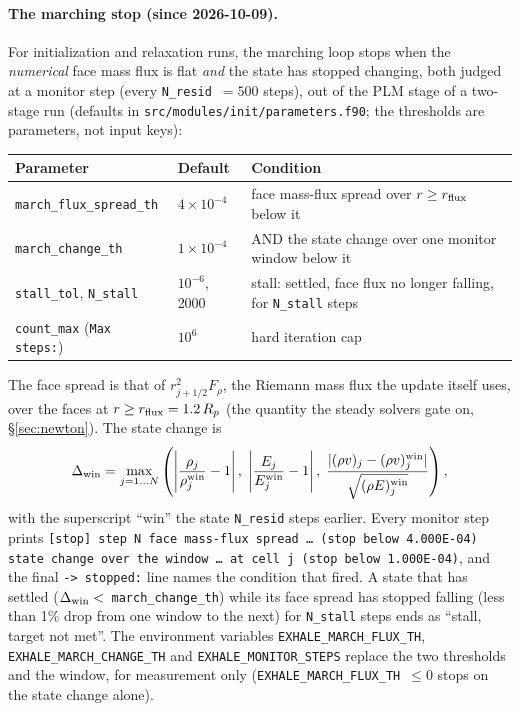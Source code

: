 \documentclass[english,a4paper]{my_memo}
\begin{document}
\paragraph{The marching stop (since 2026-10-09).} For initialization and relaxation runs, the marching loop stops when
the \emph{numerical} face mass flux is flat \emph{and} the state has stopped
changing, both judged at a monitor step (every \texttt{N\_resid}~$=500$
steps), out of the PLM stage of a two-stage run (defaults in
\texttt{src/modules/init/parameters.f90}; the thresholds are parameters, not
input keys):
\begin{center}\small
\begin{tabular}{@{}lll@{}}
\toprule
Parameter & Default & Condition \\
\midrule
\texttt{march\_flux\_spread\_th} & $4\times10^{-4}$ & face mass-flux spread over $r\ge r_{\rm flux}$ below it \\
\texttt{march\_change\_th} & $1\times10^{-4}$ & AND the state change over one monitor window below it \\
\texttt{stall\_tol}, \texttt{N\_stall} & $10^{-6}$, 2000 & stall: settled, face flux no longer falling, for \texttt{N\_stall} steps \\
\texttt{count\_max} (\texttt{Max steps:}) & $10^{6}$ & hard iteration cap \\
\bottomrule
\end{tabular}
\end{center}
\noindent
The face spread is that of $r_{j+1/2}^2F_\rho$, the Riemann mass flux the update
itself uses, over the faces at $r\ge r_{\rm flux}=1.2\,R_p$ (the quantity the
steady solvers gate on, \S\ref{sec:newton}). The state change is
\[
  \Delta_{\rm win}=\max_{j=1\ldots N}\left(
   \left|\frac{\rho_j}{\rho_j^{\rm win}}-1\right|,\;
   \left|\frac{E_j}{E_j^{\rm win}}-1\right|,\;
   \frac{|(\rho v)_j-(\rho v)_j^{\rm win}|}{\sqrt{(\rho E)_j^{\rm win}}}\right),
\]
with the superscript ``win'' the state \texttt{N\_resid} steps earlier. Every
monitor step prints
\texttt{[stop] step N  face mass-flux spread \ldots\ (stop below 4.000E-04)
state change over the window \ldots\ at cell j (stop below 1.000E-04)}, and the
final \texttt{-> stopped:} line names the condition that fired. A state that
has settled ($\Delta_{\rm win}<$~\texttt{march\_change\_th}) while its face
spread has stopped falling (less than 1\% drop from one window to the next)
for \texttt{N\_stall} steps ends as ``stall, target not met''. The environment
variables \texttt{EXHALE\_MARCH\_FLUX\_TH}, \texttt{EXHALE\_MARCH\_CHANGE\_TH} and
\texttt{EXHALE\_MONITOR\_STEPS} replace the two thresholds and the window, for
measurement only (\texttt{EXHALE\_MARCH\_FLUX\_TH}~$\le0$ stops on the state
change alone).
\end{document}
